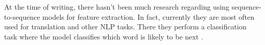 At the time of writing, there hasn't been much research regarding using sequence-to-sequence models for feature extraction.
In fact, currently they are most often used for translation and other NLP tasks.
There they perform a classification task where the model classifies which word is likely to be next \cite{tensorflowseq2seq,cho2014learning,rnnencoder,sutskever_vinyals_le}.

%
%
%

